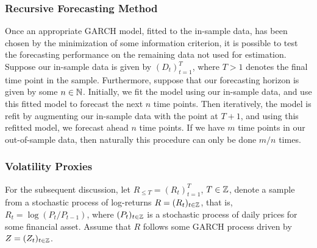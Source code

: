 \subsubsection{Recursive Forecasting Method}
Once an appropriate GARCH model, fitted to the in-sample data, has been chosen by the minimization of some information criterion, it is possible to test the forecasting performance on the remaining data not used for estimation. Suppose our in-sample data is given by $(D_{t})_{t=1}^{T}$, where $T>1$ denotes the final time point in the sample. Furthermore, suppose that our forecasting horizon  is given by some $n\in \mathbb{N}$. Initially, we fit the model using our in-sample data, and use this fitted model to forecast the next $n$ time points. Then iteratively, the model is refit by augmenting our in-sample data with the point at $T+1$, and using this refitted model, we forecast ahead $n$ time points. If we have $m$ time points in our out-of-sample data, then naturally this procedure can only be done $m/n$ times.

\subsubsection{Volatility Proxies}
For the subsequent discussion, let $R_{\leq T}=(R_{t})_{t=1}^{T}$, $T\in\mathbb{Z}$, denote a sample from a stochastic process of log-returns $R=(R_{t})_{t\in\mathbb{Z}}$, that is, $R_{t}=\log(P_{t}/P_{t-1})$, where $(P_{t})_{t\in\mathbb{Z}}$ is a stochastic process of daily prices for some financial asset. Assume that $R$ follows some GARCH process driven by $Z=(Z_{t})_{t\in\mathbb{Z}}$.

